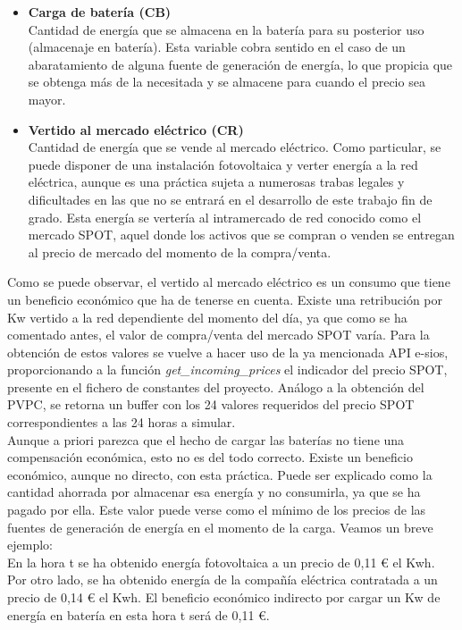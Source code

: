 \begin{itemize}
	\item \textbf{Carga de batería (CB)}\\Cantidad de energía que se almacena en la batería para su posterior uso (almacenaje en batería). Esta variable cobra sentido en el caso de un abaratamiento de alguna fuente de generación de energía, lo que propicia que se obtenga más de la necesitada y se almacene para cuando el precio sea mayor.
	\item \textbf{Vertido al mercado eléctrico (CR)}\\Cantidad de energía que se vende al mercado eléctrico. Como particular, se puede disponer de una instalación fotovoltaica y verter energía a la red eléctrica, aunque es una práctica sujeta a numerosas trabas legales y dificultades en las que no se entrará en el desarrollo de este trabajo fin de grado. Esta energía se vertería al intramercado de red conocido como el mercado SPOT, aquel donde los activos que se compran o venden se entregan al precio de mercado del momento de la compra/venta.
\end{itemize}

Como se puede observar, el vertido al mercado eléctrico es un consumo que tiene un beneficio económico que ha de tenerse en cuenta. Existe una retribución por Kw vertido a la red dependiente del momento del día, ya que como se ha comentado antes, el valor de compra/venta del mercado SPOT varía. Para la obtención de estos valores se vuelve a hacer uso de la ya mencionada API e-sios, proporcionando a la función \textit{get\_incoming\_prices} el indicador del precio SPOT, presente en el fichero de constantes del proyecto. Análogo a la obtención del PVPC, se retorna un buffer con los 24 valores requeridos del precio SPOT correspondientes a las 24 horas a simular.\\

Aunque a priori parezca que el hecho de cargar las baterías no tiene una compensación económica, esto no es del todo correcto. Existe un beneficio económico, aunque no directo, con esta práctica. Puede ser explicado como la cantidad ahorrada por almacenar esa energía y no consumirla, ya que se ha pagado por ella. Este valor puede verse como el mínimo de los precios de las fuentes de generación de energía en el momento de la carga. Veamos un breve ejemplo:\\En la hora t se ha obtenido energía fotovoltaica a un precio de 0,11 € el Kwh. Por otro lado, se ha obtenido energía de la compañía eléctrica contratada a un precio de 0,14 € el Kwh. El beneficio económico indirecto por cargar un Kw de energía en batería en esta hora t será de 0,11 €.

